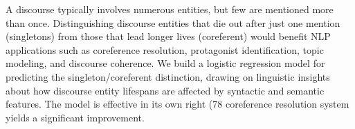 A discourse typically involves numerous entities, but few are mentioned more than once. Distinguishing discourse entities that die out after just one
 mention (singletons) from those that lead longer lives (coreferent) would
 benefit NLP applications such as coreference resolution, protagonist
 identification, topic modeling, and discourse coherence. We build a logistic
 regression model for predicting the singleton/coreferent distinction, drawing
 on linguistic insights about how discourse entity lifespans
 are affected by syntactic and semantic features. The model is effective in its
 own right (78%
 coreference resolution system yields a significant improvement.

